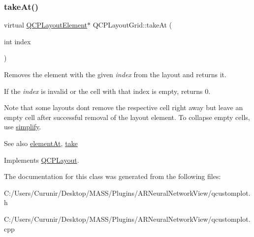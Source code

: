 \mbox{\label{class_q_c_p_layout_grid_a6c649e95e9550f671ca130d7ebc97feb}} 
\subsubsection{\texorpdfstring{take\+At()}{takeAt()}\hspace{0.1cm}{\footnotesize\ttfamily [2/2]}}
{\footnotesize\ttfamily virtual \hyperlink{class_q_c_p_layout_element}{Q\+C\+P\+Layout\+Element}$\ast$ Q\+C\+P\+Layout\+Grid\+::take\+At (\begin{DoxyParamCaption}\item[{int}]{index }\end{DoxyParamCaption})\hspace{0.3cm}{\ttfamily [virtual]}}

Removes the element with the given {\itshape index} from the layout and returns it.

If the {\itshape index} is invalid or the cell with that index is empty, returns 0.

Note that some layouts don\textquotesingle{}t remove the respective cell right away but leave an empty cell after successful removal of the layout element. To collapse empty cells, use \hyperlink{class_q_c_p_layout_grid_a38621ca7aa633b6a9a88617df7f08672}{simplify}.

\begin{DoxySeeAlso}{See also}
\hyperlink{class_q_c_p_layout_grid_a4288f174082555f6bd92021bdedb75dc}{element\+At}, \hyperlink{class_q_c_p_layout_grid_aee961c2eb6cf8a85dcbc5a7d7b6c1a00}{take} 
\end{DoxySeeAlso}


Implements \hyperlink{class_q_c_p_layout_a5a79621fa0a6eabb8b520cfc04fb601a}{Q\+C\+P\+Layout}.



The documentation for this class was generated from the following files\+:\begin{DoxyCompactItemize}
\item 
C\+:/\+Users/\+Curunir/\+Desktop/\+M\+A\+S\+S/\+Plugins/\+A\+R\+Neural\+Network\+View/qcustomplot.\+h\item 
C\+:/\+Users/\+Curunir/\+Desktop/\+M\+A\+S\+S/\+Plugins/\+A\+R\+Neural\+Network\+View/qcustomplot.\+cpp\end{DoxyCompactItemize}
